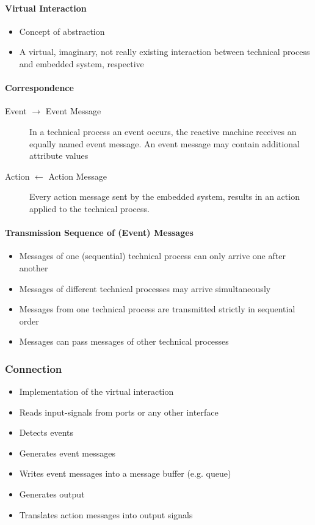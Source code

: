 \paragraph{Virtual Interaction}
\begin{itemize}
    \item Concept of abstraction
    \item A virtual, imaginary, not really existing interaction between technical process and embedded system, respective
\end{itemize}

\paragraph{Correspondence}
\begin{description}
    \item[Event $\rightarrow$ Event Message] In a technical process an event occurs, the reactive machine receives an equally named event message.
          An event message may contain additional attribute values
    \item[Action $\leftarrow$ Action Message] Every action message sent by the embedded system, results in an action applied to the technical process.
\end{description}

\paragraph{Transmission Sequence of (Event) Messages}
\begin{itemize}
    \item Messages of one (sequential) technical process can only arrive one after another
    \item Messages of different technical processes may arrive simultaneously
    \item Messages from one technical process are transmitted strictly in sequential order
    \item Messages can pass messages of other technical processes
\end{itemize}

\subsubsection{Connection}
\begin{itemize}
    \item Implementation of the virtual interaction
    \item Reads input-signals from ports or any other interface
    \item Detects events
    \item Generates event messages
    \item Writes event messages into a message buffer (e.g. queue)
    \item Generates output
    \item Translates action messages into output signals
\end{itemize}

